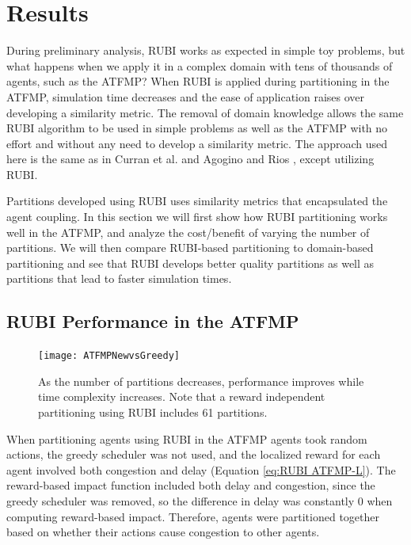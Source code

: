 \documentclass{aamas2014}
\begin{document}
\section{Results}

During preliminary analysis, RUBI works as expected in simple toy problems, but what happens when we apply it in a complex domain with tens of thousands of agents, such as the ATFMP? When RUBI is applied during partitioning in the ATFMP, simulation time decreases and the ease of application raises over developing a similarity metric. The removal of domain knowledge allows the same RUBI algorithm to be used in simple problems as well as the ATFMP with no effort and without any need to develop a similarity metric. The approach used here is the same as in Curran et al. \cite{Curran:2013:AHC:2484920.2485183} and Agogino and Rios \cite{Agogino:2009:EEM:1570256.1570258, Rios}, except utilizing RUBI.

Partitions developed using RUBI uses similarity metrics that encapsulated the agent coupling. In this section we will first show how RUBI partitioning works well in the ATFMP, and analyze the cost/benefit of varying the number of partitions. We will then compare RUBI-based partitioning to domain-based partitioning and see that RUBI develops better quality partitions as well as partitions that lead to faster simulation times.


\subsection{RUBI Performance in the ATFMP}

\begin{figure}
\centering
\texttt{[image: ATFMPNewvsGreedy]}
\caption{As the number of partitions decreases, performance improves while time complexity increases. Note that a reward independent partitioning using RUBI includes 61 partitions. }
\label{ATFMPNewvsGreedy}
\end{figure}


When partitioning agents using RUBI in the ATFMP agents took random actions, the greedy scheduler was not used, and the localized reward for each agent involved both congestion and delay (Equation \ref{eq:RUBI ATFMP-L}). The reward-based impact function included both delay and congestion, since the greedy scheduler was removed, so the difference in delay was constantly 0 when computing reward-based impact. Therefore, agents were partitioned together based on whether their actions cause congestion to other agents. 
\end{document}
